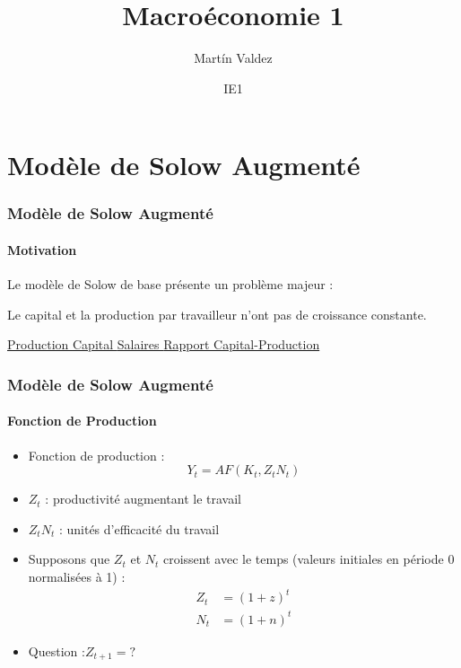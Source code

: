 \documentclass{beamer}
\title{Macroéconomie 1}
\author{Mart\'in Valdez}
\date{IE1}
\begin{document}
\begin{frame}
\titlepage
\end{frame}




\section{Modèle de Solow Augmenté}

\begin{frame}
    \frametitle{Modèle de Solow Augmenté}
    \framesubtitle{Motivation}
    \hypertarget{augmented_solow}{} %
    Le modèle de Solow de base présente un problème majeur :

    Le capital et la production par travailleur n'ont pas de croissance constante.
    
    \hyperlink{growth}{Production }
    \hyperlink{capital}{Capital }
    \hyperlink{wages}{Salaires }
    \hyperlink{capital_output_ratio}{Rapport Capital-Production}

\end{frame}

\begin{frame}
    \frametitle{Modèle de Solow Augmenté}
    \framesubtitle{Fonction de Production}

    \begin{itemize}
        \item Fonction de production :
        \[
        Y_t = A F(K_t, Z_t N_t)
        \]
        \pause
        \item \( Z_t \) : productivité augmentant le travail
        \item \( Z_t N_t \) : unités d'efficacité du travail
        \pause
        \item Supposons que \( Z_t \) et \( N_t \) croissent avec le temps (valeurs initiales en période 0 normalisées à 1) :
            \begin{align*}
                Z_t &= (1 + z)^t \\
                N_t &= (1 + n)^t
            \end{align*}
        \item Question :\(Z_{t+1} = ?\)
    \end{itemize}
\end{frame}
\end{document}
